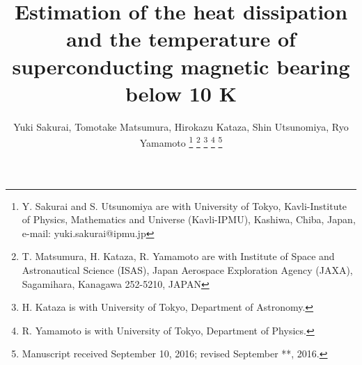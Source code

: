 \documentclass[journal]{IEEEtran}
\begin{document}
%
\title{Estimation of the heat dissipation and the temperature of superconducting magnetic bearing below 10 K}
%
%
%

\author{Yuki Sakurai, Tomotake Matsumura, Hirokazu Kataza, Shin Utsunomiya, Ryo Yamamoto
\thanks{Y. Sakurai and S. Utsunomiya are with University of Tokyo, Kavli-Institute of Physics, Mathematics and Universe (Kavli-IPMU), Kashiwa, Chiba, Japan, e-mail: yuki.sakurai@ipmu.jp}
\thanks{T. Matsumura, H. Kataza, R. Yamamoto are with Institute of Space and Astronautical Science (ISAS), Japan Aerospace Exploration Agency (JAXA), Sagamihara, Kanagawa 252-5210, JAPAN}
\thanks{H. Kataza is with University of Tokyo, Department of Astronomy.}
\thanks{R. Yamamoto is with University of Tokyo, Department of Physics.}
\thanks{Manuscript received September 10, 2016; revised September **, 2016.}}

%
%
\end{document}
